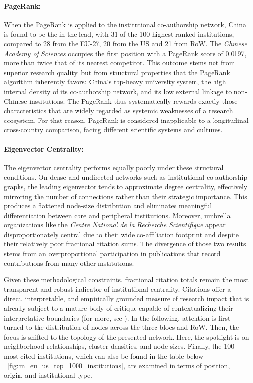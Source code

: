 \documentclass{article}
\begin{document}
	\paragraph{PageRank:} When the PageRank is applied to the institutional co-authorship network, China is found to be the in the lead, with 31 of the 100 highest-ranked institutions, compared to 28 from the EU-27, 20 from the US and 21 from RoW. The \textit{Chinese Academy of Sciences} occupies the first position with a PageRank score of 0.0197, more than twice that of its nearest competitor. This outcome stems not from superior research quality, but from structural properties that the PageRank algorithm inherently favors: China’s top-heavy university system, the high internal density of its co-authorship network, and its low external linkage to non-Chinese institutions. The PageRank thus systematically rewards exactly those characteristics that are widely regarded as systemic weaknesses of a research ecosystem. For that reason, PageRank is considered inapplicable to a longitudinal cross-country comparison, facing different scientific systems and cultures.
	
	\paragraph{Eigenvector Centrality:} The eigenvector centrality performs equally poorly under these structural conditions. On dense and undirected networks such as institutional co-authorship graphs, the leading eigenvector tends to approximate degree centrality, effectively mirroring the number of connections rather than their strategic importance. This produces a flattened node-size distribution and eliminates meaningful differentiation between core and peripheral institutions. Moreover, umbrella organizations like the \textit{Centre National de la Recherche Scientifique} appear disproportionately central due to their wide co-affiliation footprint and despite their relatively poor fractional citation sums. The divergence of those two results stems from an overproportional participation in publications that record contributions from many other institutions.
	
	Given these methodological constraints, fractional citation totals remain the most transparent and robust indicator of institutional centrality. Citations offer a direct, interpretable, and empirically grounded measure of research impact that is already subject to a mature body of critique capable of contextualizing their interpretative boundaries (for more, see ). In the following, attention is first turned to the distribution of nodes across the three blocs and RoW. Then, the focus is shifted to the topology of the presented network. Here, the spotlight is on neighborhood relationships, cluster densities, and node sizes. Finally, the 100 most-cited institutions, which can also be found in the table below \figurename~\ref{fig:cn_eu_us_top_1000_institutions}, are examined in terms of position, origin, and institutional type.
	
\end{document}
